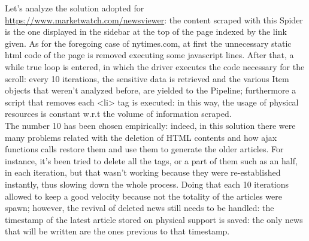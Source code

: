\par 
Let's analyze the solution adopted for \url{https://www.marketwatch.com/newsviewer}: the content scraped with this Spider is the one displayed in the sidebar at the top of the page indexed by the link given. As for the foregoing case of nytimes.com, at first the unnecessary static html code of the page is removed executing some javascript lines. After that, a while true loop is entered, in which the driver executes the code necessary for the scroll: every 10 iterations, the sensitive data is retrieved and the various Item objects that weren't analyzed before, are yielded to the Pipeline; furthermore a script that removes each <li> tag is executed: in this way, the usage of physical resources is constant w.r.t the volume of information scraped. \\
The number 10 has been chosen empirically: indeed, in this solution there were many problems related with the deletion of HTML contents and how ajax functions calls restore them and use them to generate the older articles. For instance, it's been tried to delete all the tags, or a part of them such as an half, in each iteration, but that wasn't working because they were re-established instantly, thus slowing down the whole process. Doing that each 10 iterations allowed to keep a good velocity because not the totality of the articles were spawn; however, the revival of deleted news still needs to be handled: the timestamp of the latest article stored on physical support is saved: the only news that will be written are the ones previous to that timestamp.
\par 
\par  
